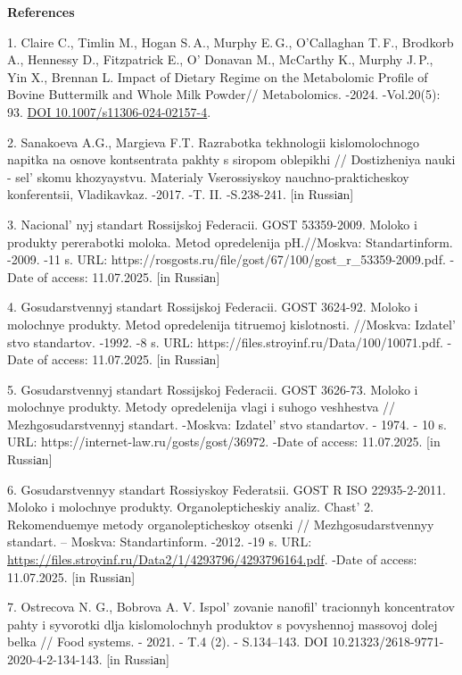 \begin{center}
{\bfseries References}
\end{center}

\begin{refs}
1. Claire C., Timlin M., Hogan S.\,A., Murphy E.\,G., O'Callaghan
T.\,F., Brodkorb A., Hennessy D., Fitzpatrick E.,
O' Donavan M., McCarthy K., Murphy J.\,P., Yin X.,
Brennan L. Impact of Dietary Regime on the Metabolomic Profile of Bovine
Buttermilk and Whole Milk Powder// Metabolomics. -2024. -Vol.20(5):
\,93. \href{https://doi.org/10.1007/s11306-024-02157-4}{DOI
10.1007/s11306-024-02157-4}.

2. Sanakoeva A.G., Margieva F.T. Razrabotka tekhnologii kislomolochnogo
napitka na osnove kontsentrata pakhty s siropom oblepikhi //
Dostizheniya nauki - sel' skomu khozyaystvu. Materialy
Vserossiyskoy nauchno-prakticheskoy konferentsii, Vladikavkaz. -2017.
-T. II. -S.238-241. {[}in Russiаn{]}

3. Nacional' nyj standart Rossijskoj Federacii. GOST
53359-2009. Moloko i produkty pererabotki moloka. Metod opredelenija
pH.//Moskva: Standartinform. -2009. -11 s. URL:
https://rosgosts.ru/file/gost/67/100/gost\_r\_53359-2009.pdf. -Date of
access: 11.07.2025. {[}in Russiаn{]}

4. Gosudarstvennyj standart Rossijskoj Federacii. GOST 3624-92. Moloko i
molochnye produkty. Metod opredelenija titruemoj kislotnosti. //Moskva:
Izdatel' stvo standartov. -1992. -8 s. URL:
https://files.stroyinf.ru/Data/100/10071.pdf. -Date of access:
11.07.2025. {[}in Russiаn{]}

5. Gosudarstvennyj standart Rossijskoj Federacii. GOST 3626-73. Moloko i
molochnye produkty. Metody opredelenija vlagi i suhogo veshhestva //
Mezhgosudarstvennyj standart. -Moskva: Izdatel' stvo
standartov. - 1974. - 10 s. URL:
https://internet-law.ru/gosts/gost/36972. -Date of access: 11.07.2025.
{[}in Russiаn{]}

6. Gosudarstvennyy standart Rossiyskoy Federatsii. GOST R ISO
22935-2-2011. Moloko i molochnye produkty. Organolepticheskiy analiz.
Chast' 2. Rekomenduemye metody organolepticheskoy otsenki //
Mezhgosudarstvennyy standart. -- Moskva: Standartinform. -2012. -19 s.
URL: \url{https://files.stroyinf.ru/Data2/1/4293796/4293796164.pdf}.
-Date of access: 11.07.2025. {[}in Russiаn{]}

7. Ostrecova N. G., Bobrova A. V. Ispol' zovanie
nanofil' tracionnyh koncentratov pahty i syvorotki dlja
kislomolochnyh produktov s povyshennoj massovoj dolej belka // Food
systems. - 2021. - T.4 (2). - S.134--143. DOI
10.21323/2618-9771-2020-4-2-134-143. {[}in Russiаn{]}


\end{refs}
